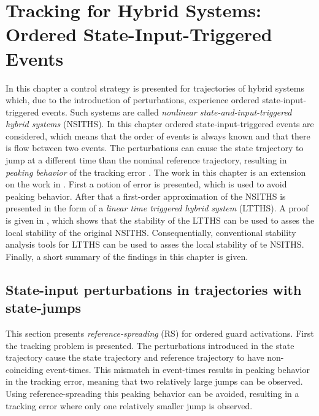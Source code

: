 \documentclass[../DC2017114Bouma.tex]{subfiles}
\begin{document}
\graphicspath{{03_Contribution/img/}}
\renewcommand{\chaptermark}[1]{\markboth{\thechapter.\ #1}{}}
\renewcommand{\sectionmark}[1]{\markright{#1}{}}

\pagestyle{fancyreport}
\cleartooddpage
\pagestyle{fancyreport}
\chapter{Tracking for Hybrid Systems: Ordered State-Input-Triggered Events}\label{ch:order}
In this chapter a control strategy is presented for trajectories of hybrid systems which, due to the introduction of perturbations, experience ordered state-input-triggered events. Such systems are called \textit{nonlinear state-and-input-triggered hybrid systems} (NSITHS). In this chapter ordered state-input-triggered events are considered, which means that the order of events is always known and that there is flow between two events. The perturbations can cause the state trajectory to jump at a different time than the nominal reference trajectory, resulting in \textit{peaking behavior} of the tracking error \cite{Menini2001,Biemond2013}. The work in this chapter is an extension on the work in \cite{Rijnen2017}. First a notion of error is presented, which is used to avoid peaking behavior. After that a first-order approximation of the NSITHS is presented in the form of a \textit{linear time triggered hybrid system} (LTTHS). A proof is given in \cite{Rijnen2017}, which shows that the stability of the LTTHS can be used to asses the local stability of the original NSITHS. Consequentially, conventional stability analysis tools for LTTHS can be used to asses the local stability of te NSITHS. Finally, a short summary of the findings in this chapter is given.
%
%

\section{State-input perturbations in trajectories with state-jumps}
This section presents \textit{reference-spreading} (RS) for ordered guard activations. First the tracking problem is presented. The perturbations introduced in the state trajectory cause the state trajectory and reference trajectory to have non-coinciding event-times. This mismatch in event-times results in peaking behavior in the tracking error, meaning that two relatively large jumps can be observed. Using reference-spreading this peaking behavior can be avoided, resulting in a tracking error where only one relatively smaller jump is observed.
%
\end{document}
